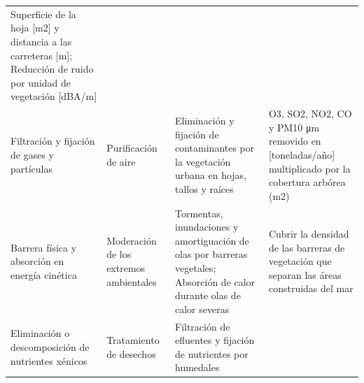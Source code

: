\documentclass[12pt,a4paper,openany]{book}
\theoremstyle{definition}
\theoremstyle{definition}
\theoremstyle{definition}
\theoremstyle{remark}
\begin{document}
\begin{longtable}[]{@{}llll@{}}
\begin{minipage}[t]{0.22\columnwidth}
Superficie de la hoja {[}m2{]} y distancia a las carreteras {[}m{]};
Reducción de ruido por unidad de vegetación {[}dBA/m{]}\strut
\end{minipage}\tabularnewline
\begin{minipage}[t]{0.26\columnwidth}\raggedright\strut
Filtración y fijación de gases y partículas\strut
\end{minipage} & \begin{minipage}[t]{0.22\columnwidth}\raggedright\strut
Purificación de aire\strut
\end{minipage} & \begin{minipage}[t]{0.19\columnwidth}\raggedright\strut
Eliminación y fijación de contaminantes por la vegetación urbana en
hojas, tallos y raíces\strut
\end{minipage} & \begin{minipage}[t]{0.22\columnwidth}\raggedright\strut
O3, SO2, NO2, CO y PM10 μm removido en {[}toneladas/año{]} multiplicado
por la cobertura arbórea (m2)\strut
\end{minipage}\tabularnewline
\begin{minipage}[t]{0.26\columnwidth}\raggedright\strut
Barrera física y absorción en energía cinética\strut
\end{minipage} & \begin{minipage}[t]{0.22\columnwidth}\raggedright\strut
Moderación de los extremos ambientales\strut
\end{minipage} & \begin{minipage}[t]{0.19\columnwidth}\raggedright\strut
Tormentas, inundaciones y amortiguación de olas por barreras vegetales;
Absorción de calor durante olas de calor severas\strut
\end{minipage} & \begin{minipage}[t]{0.22\columnwidth}\raggedright\strut
Cubrir la densidad de las barreras de vegetación que separan las áreas
construidas del mar\strut
\end{minipage}\tabularnewline
\begin{minipage}[t]{0.26\columnwidth}\raggedright\strut
Eliminación o descomposición de nutrientes xénicos\strut
\end{minipage} & \begin{minipage}[t]{0.22\columnwidth}\raggedright\strut
Tratamiento de desechos\strut
\end{minipage} & \begin{minipage}[t]{0.19\columnwidth}\raggedright\strut
Filtración de efluentes y fijación de nutrientes por humedales

\end{minipage}
\end{longtable}
\end{document}
